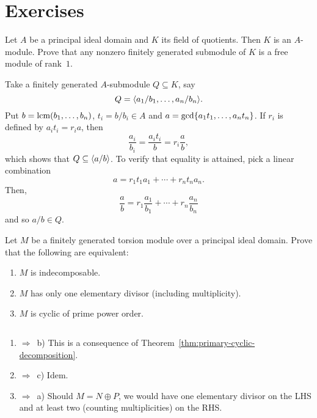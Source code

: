 \section{Exercises}

\begin{exr}\label{exr:quotient-field-submodules-locally-free}
    Let\/ $A$ be a principal ideal domain and\/ $K$ its field of quotients. Then\/ $K$ is an\/ $A$-module. Prove that any nonzero finitely generated submodule of\/ $K$ is a free module of rank\/~$1$.
\end{exr}

\begin{solution}
    Take a finitely generated $A$-submodule $Q\subseteq K$, say
    $$
        Q=\langle a_1/b_1,\dots, a_n/b_n\rangle.
    $$
    Put $b=\operatorname{lcm}(b_1,\dots,b_n)$, $t_i=b/b_i\in A$ and $a = \gcd\{a_1t_1,\dots,a_nt_n\}$. If $r_i$ is defined by $a_it_i=r_ia$, then
    $$
        \frac{a_i}{b_i} = \frac{a_it_i}b = r_i\frac{a}b,
    $$
    which shows that $Q\subseteq\langle a/b\rangle$. To verify that equality is attained, pick a linear combination
    $$
        a = r_1t_1a_1+\cdots+r_nt_na_n.
    $$
    Then,
    $$
        \frac ab = r_1\frac{a_1}{b_1}+\cdots
            +r_n\frac{a_n}{b_n}
    $$
    and so $a/b\in Q$.
\end{solution}



\begin{exr}
    Let\/ $M$ be a finitely generated torsion module over a principal ideal domain.  
    Prove that the following are equivalent:  
    \begin{enumerate}[\rm a)]
        \item $M$ is indecomposable.
        \item $M$ has only one elementary divisor (including multiplicity).
        \item $M$ is cyclic of prime power order.
    \end{enumerate}
\end{exr}

\begin{solution}${}$
    \begin{enumerate}[\rm a)]
        \item $\Rightarrow$~b) This is a consequence of Theorem~\ref{thm:primary-cyclic-decomposition}.

        \item $\Rightarrow$~c) Idem.

        \item $\Rightarrow$~a) Should $M=N\oplus P$, we would have one elementary divisor on the LHS and at least two (counting multiplicities) on the RHS.
    \end{enumerate}
\end{solution}

